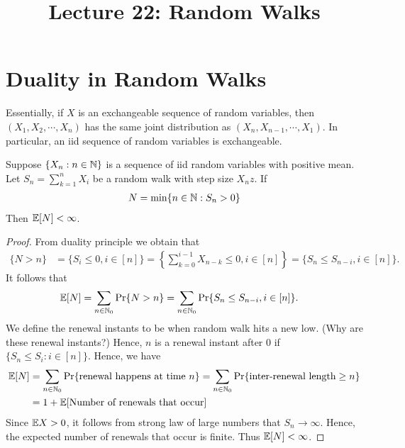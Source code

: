 \documentclass[a4paper,10pt,english]{article}
\title{Lecture 22: Random Walks}
\author{}
\begin{document}
\maketitle
\section{Duality in Random Walks}
Essentially, if $X$ is an exchangeable sequence of random variables, then $(X_1,X_2,\cdots,X_n)$ has the same joint distribution as $(X_n, X_{n-1},\cdots, X_1)$. 
In particular, an iid sequence of random variables is exchangeable. 
\begin{prop}
Suppose $\{X_n: n \in \mathbb{N}\}$ is a sequence of iid random variables with positive mean. Let $S_n = \sum_{k=1}^n X_i$ be a random walk with step size $X_nz$. If 
\begin{align*}N = \min \{n \in \mathbb{N} : S_n > 0\}\end{align*}
Then $\mathbb{E}[N] < \infty$.
\end{prop}
\begin{proof} From duality principle we obtain that
\begin{align*}
\{N > n\} &= \{S_i \leq 0, i \in [n]\} = \left\{\sum_{k=0}^{i-1}X_{n-k} \leq 0, i \in [n]\right\} = \{S_n \leq S_{n-i}, i \in [n]\}.
\end{align*}
It follows that 
\begin{align*} 
\mathbb{E}[N] &= \sum_{n \in \mathbb{N}_0} \Pr\{N > n\}
= \sum_{n \in \mathbb{N}_0} \Pr\{S_n \leq S_{n-i}, i \in [n]\}.
\end{align*}
We define the renewal instants to be when random walk hits a new low. (Why are these renewal instants?) 
Hence, $n$ is a renewal instant after $0$ if $\{S_n \leq S_i: i \in [n]\}$. Hence, we have
\begin{align*}
\mathbb{E}[N] &= \sum_{n\in \mathbb{N}_0}\Pr\{\text{renewal happens at time } n\} = \sum_{n \in \mathbb{N}_0}\Pr\{\text{inter-renewal length} \geq n\}\\
&= 1 + \mathbb{E}[\text{Number of renewals that occur}]
\end{align*}
%
Since $\mathbb{E} X > 0$, it follows from strong law of large numbers that $S_n \to \infty$. Hence, the expected number of renewals that occur is finite. Thus $\mathbb{E}[N] < \infty$.
\end{proof}
\end{document}
